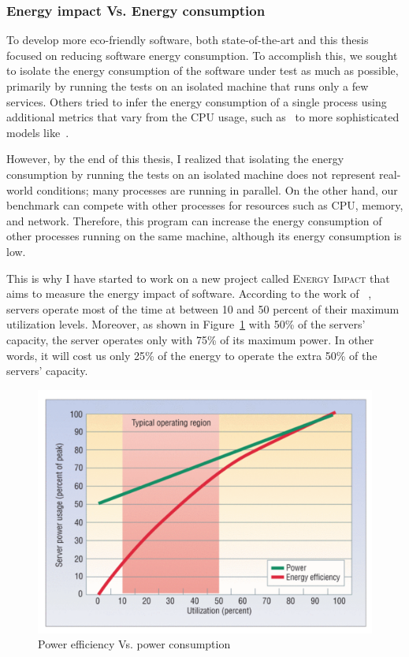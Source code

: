 \subsubsection{Energy impact Vs. Energy consumption}
To develop more eco-friendly software, both state-of-the-art and this thesis focused on reducing software energy consumption.
To accomplish this, we sought to isolate the energy consumption of the software under test as much as possible, primarily by running the tests on an isolated machine that runs only a few services.
Others tried to infer the energy consumption of a single process using additional metrics that vary from the CPU usage, such as~\cite{noureddine-issta-2016} to more sophisticated models like~\cite{fieni2020smartwatts,fieni2021selfwatts}.

However, by the end of this thesis, I realized that isolating the energy consumption by running the tests on an isolated machine does not represent real-world conditions; many processes are running in parallel.
On the other hand, our benchmark can compete with other processes for resources such as CPU, memory, and network.
Therefore, this program can increase the energy consumption of other processes running on the same machine, although its energy consumption is low.

This is why I have started to work on a new project called \textsc{Energy Impact} that aims to measure the energy impact of software.
According to the work of \citeauthor{barroso2007case}~\cite{barroso2007case}, servers operate most of the time at between 10 and 50 percent of their maximum utilization levels.
Moreover, as shown in Figure~\ref{fig:soa_energy_efficiency} with 50\% of the servers' capacity, the server operates only with 75\% of its maximum power.
In other words, it will cost us only 25\% of the energy to operate the extra 50\% of the servers' capacity.

\begin{figure}[!h]
      \centering
      \includegraphics[width=.7\linewidth,keepaspectratio]{chapters/soa_energy_efficiency}
      \caption{Power efficiency Vs. power consumption~\cite{barroso2007case}}
      \label{fig:soa_energy_efficiency}
\end{figure}

